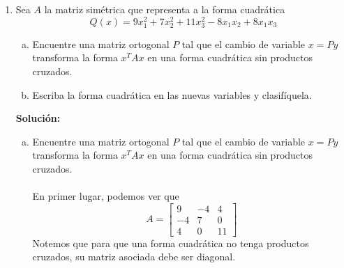 \documentclass[12pt]{article}
\newenvironment{solucion}
{\begin{mdframed}[backgroundcolor=black!10]
		{\bf Solución:}\\
	}
	{
	\end{mdframed}
}
\newenvironment{preguntas}
{\begin{enumerate}\itemsep12pt
	}
	{
	\end{enumerate}
}
\begin{document}
\begin{preguntas}
\begin{solucion}
$$\begin{bmatrix}
		 \frac{7}{3} & -1 \\
		 -1 & \frac{1}{2}
		 \end{bmatrix}$$
		 $$ X^TY = \begin{bmatrix}
		 1 & 1 & 1\\
		 1 & 2 & 3
		 \end{bmatrix} \begin{pmatrix}
		 3 \\ 5 \\ 4
		 \end{pmatrix} = 
		 \begin{pmatrix}
		 12 \\ 25
		 \end{pmatrix}$$
		 Luego,
		 $$\beta = (X^TX)^{-1}X^TY
		 = \begin{bmatrix}
		 \frac{7}{3} & -1 \\
		 -1 & \frac{1}{2}
		 \end{bmatrix}\begin{pmatrix}
		 12 \\ 25
		 \end{pmatrix}
		 = \begin{pmatrix}
		 3 \\ \frac{1}{2}
		 \end{pmatrix}
		 $$
		 Finalmente, el ajuste por mínimos cuadrados es
		 $$y = 3 + \dfrac{1}{2}x$$
\end{solucion}
\item Sea $A$ la matriz simétrica que representa a la forma cuadrática
	$$Q(x) = 9x_1^2 + 7x_2^2 + 11x_3^2 - 8x_1x_2 + 8x_1x_3$$
\begin{enumerate}[a)]
\item Encuentre una matriz ortogonal $P$ tal que el cambio de variable $x = Py$ transforma la forma $x^TAx$ en una forma cuadrática sin productos cruzados.
\item Escriba la forma cuadrática en las nuevas variables y clasifíquela.
\end{enumerate}
\begin{solucion}

\begin{enumerate}[a)]
\item Encuentre una matriz ortogonal $P$ tal que el cambio de variable $x = Py$ transforma la forma $x^TAx$ en una forma cuadrática sin productos cruzados.\\
\\
En primer lugar, podemos ver que
$$A = \begin{bmatrix}
9 & -4 & 4\\
-4 & 7 & 0\\
4 & 0 & 11
\end{bmatrix}$$
Notemos que para que una forma cuadrática no tenga productos cruzados, su matriz asociada debe ser diagonal.\\


\end{enumerate}
\end{solucion}
\end{preguntas}
\end{document}
